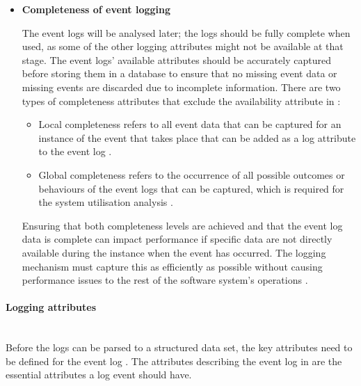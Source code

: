 \begin{itemize}
	\item \textbf{Completeness of event logging}\par The event logs will be analysed later; the logs should be fully complete when used, as some of the other logging attributes might not be available at that stage. The event logs' available attributes should be accurately captured before storing them in a database to ensure that no missing event data or missing events are discarded due to incomplete information. There are two types of completeness attributes that exclude the availability attribute in :

	\begin{itemize}
		\item Local completeness refers to all event data that can be captured for an instance of the event that takes place that can be added as a log attribute to the event log \cite{Kherbouche2017, VanDerAalst2004}.
		\item Global completeness refers to the occurrence of all possible outcomes or behaviours of the event logs that can be captured, which is required for the system utilisation analysis \cite{Kherbouche2017, VanDerAalst2004}.
	\end{itemize}

	Ensuring that both completeness levels are achieved and that the event log data is complete can impact performance if specific data are not directly available during the instance when the event has occurred. The logging mechanism must capture this as efficiently as possible without causing performance issues to the rest of the software system's operations \cite{Zhu2015, Zhu2019}. 
\end{itemize}

\paragraph{Logging attributes}\leavevmode\\
Before the logs can be parsed to a structured data set, the key attributes need to be defined for the event log \cite{Bekeneva2020}. The attributes describing the event log in  are the essential attributes a log event should have. 

